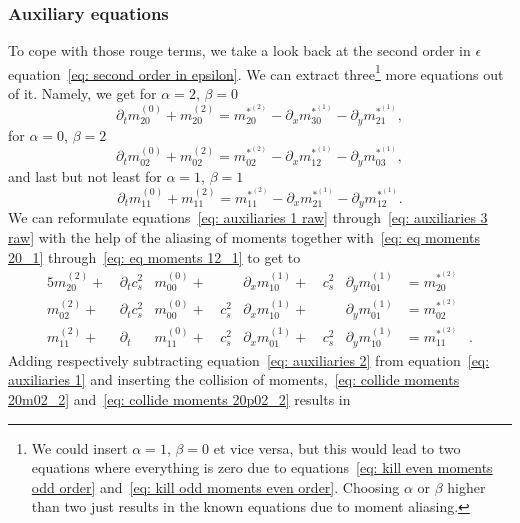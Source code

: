 \subsubsection{Auxiliary equations}
\label{subs:Auxiliary equations}
To cope with those rouge terms, we take a look back at the second order in $\epsilon$ equation~\eqref{eq: second order in epsilon}.
We can extract three\footnote{We could insert $\alpha=1$, $\beta=0$ et vice versa, but this would lead to two equations where everything is zero due to equations~\eqref{eq: kill even moments odd order} and~\eqref{eq: kill odd moments even order}.
Choosing $\alpha$ or $\beta$ higher than two just results in the known equations due to moment aliasing.} more equations out of it.
Namely, we get for $\alpha=2$, $\beta=0$
\begin{equation}
  \label{eq: auxiliaries 1 raw}
  \partial_t m_{20}^{(0)} + m_{20}^{(2)} =  m_{20}^{*^{(2)}} - \partial_x m_{30}^{*^{(1)}} - \partial_y m_{21}^{*^{(1)}},
\end{equation}
for $\alpha=0$, $\beta=2$
\begin{equation}
  \label{eq: auxiliaries 2 raw}
  \partial_t m_{02}^{(0)} + m_{02}^{(2)} =  m_{02}^{*^{(2)}} - \partial_x m_{12}^{*^{(1)}} - \partial_y m_{03}^{*^{(1)}},
\end{equation}
and last but not least for $\alpha=1$, $\beta=1$
\begin{equation}
  \label{eq: auxiliaries 3 raw}
  \partial_t m_{11}^{(0)} + m_{11}^{(2)} =  m_{11}^{*^{(2)}} - \partial_x m_{21}^{*^{(1)}} - \partial_y m_{12}^{*^{(1)}}.
\end{equation}
We can reformulate equations~\eqref{eq: auxiliaries 1 raw} through~\eqref{eq: auxiliaries 3 raw} with the help of the aliasing of moments together with~\eqref{eq: eq moments 20_1} through~\eqref{eq: eq moments 12_1} to get to
\begin{alignat}{5}
  \label{eq: auxiliaries 1}
  m_{20}^{(2)} +&\, \partial_t c_s^2& m_{00}^{(0)} +&\, &\partial_x m_{10}^{(1)} +&\, c_s^2&\partial_y m_{01}^{(1)} &=  m_{20}^{*^{(2)}}&
  \\
  \label{eq: auxiliaries 2}
  m_{02}^{(2)} +&\, \partial_t c_s^2& m_{00}^{(0)} +&\, c_s^2&\partial_x m_{10}^{(1)} +&\, &\partial_y m_{01}^{(1)} &=  m_{02}^{*^{(2)}}&
  \\
  \label{eq: auxiliaries 3}
  m_{11}^{(2)} +&\, \partial_t &m_{11}^{(0)} +&\, c_s^2&\partial_x m_{01}^{(1)} +&\, c_s^2&\partial_y m_{10}^{(1)} &=  m_{11}^{*^{(2)}}&.
\end{alignat}
Adding respectively subtracting equation~\eqref{eq: auxiliaries 2} from equation~\eqref{eq: auxiliaries 1} and inserting the collision of moments,~\eqref{eq: collide moments 20m02_2} and~\eqref{eq: collide moments 20p02_2} results in
